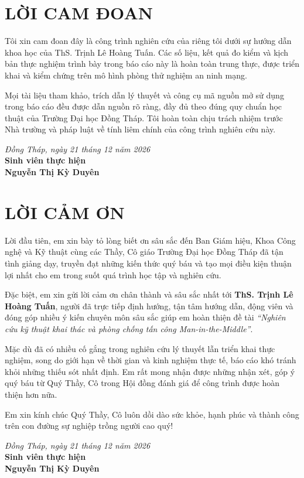 \chapter*{LỜI CAM ĐOAN}

Tôi xin cam đoan đây là công trình nghiên cứu của riêng tôi dưới sự hướng dẫn khoa học của ThS. Trịnh Lê Hoàng Tuấn. Các số liệu, kết quả đo kiểm và kịch bản thực nghiệm trình bày trong báo cáo này là hoàn toàn trung thực, được triển khai và kiểm chứng trên mô hình phòng thử nghiệm an ninh mạng.

Mọi tài liệu tham khảo, trích dẫn lý thuyết và công cụ mã nguồn mở sử dụng trong báo cáo đều được dẫn nguồn rõ ràng, đầy đủ theo đúng quy chuẩn học thuật của Trường Đại học Đồng Tháp. Tôi hoàn toàn chịu trách nhiệm trước Nhà trường và pháp luật về tính liêm chính của công trình nghiên cứu này.

\vspace{1.5cm}
\begin{flushright}
  \textit{Đồng Tháp, ngày 21 tháng 12 năm 2026}\\[0.3cm]
  \textbf{Sinh viên thực hiện}\\[1.5cm]
  \textbf{Nguyễn Thị Kỳ Duyên}
\end{flushright}

\clearpage

\chapter*{LỜI CẢM ƠN}

Lời đầu tiên, em xin bày tỏ lòng biết ơn sâu sắc đến Ban Giám hiệu, Khoa Công nghệ và Kỹ thuật cùng các Thầy, Cô giáo Trường Đại học Đồng Tháp đã tận tình giảng dạy, truyền đạt những kiến thức quý báu và tạo mọi điều kiện thuận lợi nhất cho em trong suốt quá trình học tập và nghiên cứu.

Đặc biệt, em xin gửi lời cảm ơn chân thành và sâu sắc nhất tới \textbf{ThS. Trịnh Lê Hoàng Tuấn}, người đã trực tiếp định hướng, tận tâm hướng dẫn, động viên và đóng góp nhiều ý kiến chuyên môn sâu sắc giúp em hoàn thiện đề tài \textit{``Nghiên cứu kỹ thuật khai thác và phòng chống tấn công Man-in-the-Middle''}.

Mặc dù đã có nhiều cố gắng trong nghiên cứu lý thuyết lẫn triển khai thực nghiệm, song do giới hạn về thời gian và kinh nghiệm thực tế, báo cáo khó tránh khỏi những thiếu sót nhất định. Em rất mong nhận được những nhận xét, góp ý quý báu từ Quý Thầy, Cô trong Hội đồng đánh giá để công trình được hoàn thiện hơn nữa.

Em xin kính chúc Quý Thầy, Cô luôn dồi dào sức khỏe, hạnh phúc và thành công trên con đường sự nghiệp trồng người cao quý!

\vspace{1.5cm}
\begin{flushright}
  \textit{Đồng Tháp, ngày 21 tháng 12 năm 2026}\\[0.3cm]
  \textbf{Sinh viên thực hiện}\\[1.5cm]
  \textbf{Nguyễn Thị Kỳ Duyên}
\end{flushright}
